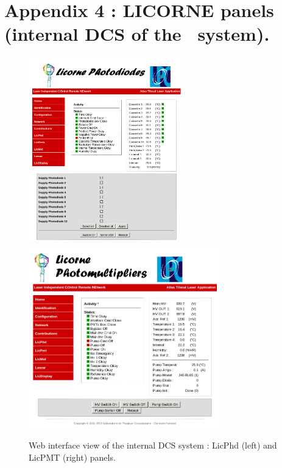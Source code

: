 \part*{Appendix 4 : LICORNE panels (internal DCS of the \lasii~system).}
\label{app:d}

\begin{figure}[htbp]
\centering
\includegraphics[height=8cm]{figures/licorne_web1.png}
\includegraphics[height=8cm]{figures/licorne_web2.png}
\caption{Web interface view of the internal DCS system : LicPhd (left) and LicPMT (right) panels.}\label{fig:licorne_weba}
\end{figure}

